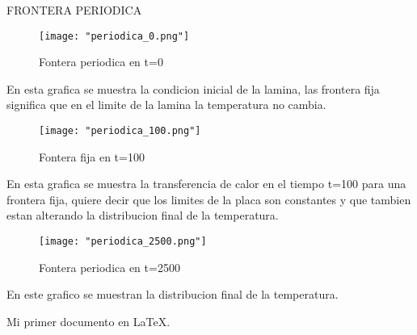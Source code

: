 \documentclass{article}
\begin{document}
FRONTERA PERIODICA
\begin{figure}
  \centering
    \texttt{[image: "periodica\_0.png"]}
  \caption{Fontera periodica en t=0}
  \label{fija en t=0}
\end{figure}
En esta grafica se muestra la condicion inicial de la lamina, las frontera fija significa que en el limite de la lamina la temperatura no cambia.
\begin{figure}
  \centering
    \texttt{[image: "periodica\_100.png"]}
  \caption{Fontera fija en t=100}
  \label{periodica en t=100}
\end{figure}
En esta grafica se muestra la transferencia de calor en el tiempo t=100 para una frontera fija, quiere decir que los limites de la placa son constantes y que tambien estan alterando la distribucion final de la temperatura.
\begin{figure}
  \centering
    \texttt{[image: "periodica\_2500.png"]}
  \caption{Fontera periodica en t=2500}
  \label{periodica en t=2500}
\end{figure}
En este grafico se muestran la distribucion final de la temperatura.

Mi primer documento en \LaTeX{}.
\end{document}
